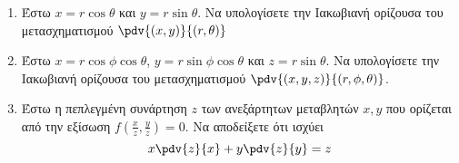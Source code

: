 \begin{enumerate}
  \item Έστω $ x = r \cos{\theta} $ και $ y = r \sin{\theta} $.  Να υπολογίσετε την 
    Ιακωβιανή ορίζουσα του μετασχηματισμού $ \pdv{(x,y)}{(r,\theta)} $

  \item Έστω $ x = r \cos{\phi} \cos{\theta} $, $ y = r \sin{\phi} \cos{\theta} $ και 
    $ z = r \sin{\theta} $. Να υπολογίσετε την Ιακωβιανή ορίζουσα του μετασχηματισμού 
    $ \pdv{(x,y,z)}{(r,\phi, \theta)} $.

  \item Έστω η πεπλεγμένη συνάρτηση $ z $ των ανεξάρτητων μεταβλητών $ x,y $ που 
    ορίζεται από την εξίσωση $ f\left(\frac{ x }{ z }, \frac{ y }{ z }\right) = 0 $. 
    Να αποδείξετε ότι ισχύει 
    \[
      x\pdv{z}{x} + y\pdv{z}{y} = z
    \] 
\end{enumerate}



